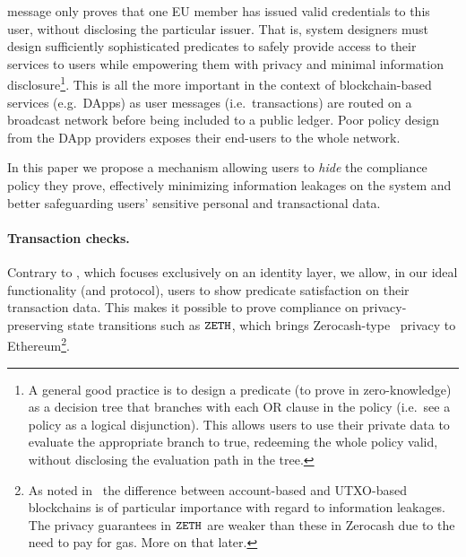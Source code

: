 \documentclass[runningheads,10pt]{llncs}
\numberwithin{equation}{section}
\begin{document}
message only proves that one EU member has issued valid credentials to this
user, without disclosing the particular issuer. That is, system designers must
design sufficiently sophisticated predicates to safely provide access to their
services to users while empowering them with privacy and minimal information
disclosure\footnote{A general good practice is to design a predicate (to prove
in zero-knowledge) as a decision tree that branches with each OR clause in the
policy (i.e.~see a policy as a logical disjunction). This allows users to use
their private data to evaluate the appropriate branch to true, redeeming the
whole policy valid, without disclosing the evaluation path in the tree.}. This
is all the more important in the context of blockchain-based services
(e.g.~DApps) as user messages (i.e.~transactions) are routed on a broadcast
network before being included to a public ledger. Poor policy design from the
DApp providers exposes their end-users to the whole network.

In this paper we propose a mechanism allowing users to \emph{hide} the
compliance policy they prove, effectively minimizing information leakages on
the system and better safeguarding users' sensitive personal and transactional
data.

\paragraph{Transaction checks.}
Contrary to \cite{EPRINT:DGKOS20}, which focuses exclusively on an identity
layer, we allow, in our ideal functionality (and protocol), users to show
predicate satisfaction on their transaction data. This makes it possible to
prove compliance on privacy-preserving state transitions such as $\mathtt{ZETH}$, which
brings Zerocash-type~\cite{SP:BCGGMT14} privacy to Ethereum\footnote{As noted
in~\cite{DBLP:journals/corr/abs-1904-00905} the difference between
account-based and UTXO-based blockchains is of particular importance with
regard to information leakages. The privacy guarantees in $\mathtt{ZETH}$ are weaker
than these in Zerocash due to the need to pay for gas. More on that later.}.
\end{document}
